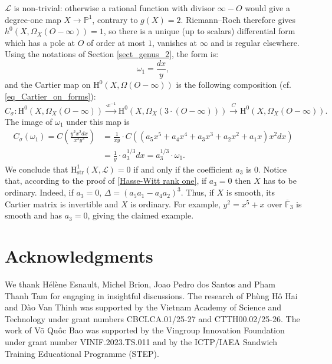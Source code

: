 \documentclass[12pt,a4]{amsart}
\theoremstyle{definition}
\begin{document}
\begin{appendix}
$\mathcal L$ is non-trivial: otherwise a rational function with divisor
$\infty-O$ would give a degree-one map $X\to\mathbb P^1$, contrary to $g(X)=2$.
Riemann--Roch therefore gives $h^0(X,\Omega_X(O-\infty))=1$, so there is a 
unique (up to scalars)  differential form which has a pole at $O$ of order at most
$1$, vanishes at $\infty$ and is regular elsewhere. 
Using the notations of Section \ref{sect_genus_2}, the form is:
\begin{equation*}
\omega_1 = \frac{dx}{y},
\end{equation*} 
and the Cartier map on $\mathrm{H}^0(X,\Omega(O - \infty))$ is the following composition
(cf. \eqref{eq_Cartier_on_forms}):
\begin{equation}
C_\sigma: \mathrm{H}^0(X,\Omega_X(O - \infty)) \xrightarrow{\cdot x^{-1}} 
\mathrm{H}^0(X,\Omega_X(3\cdot(O - \infty))) \xrightarrow{C} \mathrm{H}^0(X,\Omega_X(O - \infty)).
\end{equation}
The image of $\omega_1$ under this  map is 
\begin{align*}
C_\sigma(\omega_1) = C\left(\frac{y^2x^2dx}{x^3y^3}\right) & = \frac{1}{xy}
\cdot C((a_5x^5+a_4x^4+a_3x^3+a_2x^2+a_1x)x^2dx) \\
& = \frac{1}{y}\cdot a_3^{1/3}dx = a_3^{1/3}\cdot\omega_1.
\end{align*}
We conclude that $\mathrm H^1_\mathrm{str}(X,\mathcal L)=0$ if and only if the 
coefficient $a_3$ is 0. Notice that, according to the proof of \ref{Hasse-Witt rank one}, if
$a_3=0$ then $X$ has to be ordinary. Indeed, if $a_3=0$, 
$\Delta=(a_5a_1-a_4a_2)^3$. Thus, if $X$ is smooth, its Cartier matrix
is invertible and $X$ is ordinary. For example, $y^2=x^5+x$ over
$\overline{\mathbb F}_3$ is smooth and has $a_3=0$, giving the claimed example. 

\end{appendix} 

\section*{Acknowledgments}
We thank H\'el\`ene Esnault, Michel Brion, Joao Pedro dos Santos and Pham Thanh Tam for engaging in insightful discussions. 
The research of Ph\`ung H\^o Hai and D\`ao Van Thinh was supported by the Vietnam Academy of Science and Technology under grant numbers  CBCLCA.01/25-27 and CTTH00.02/25-26. The work of V\~o Qu\^oc Bao was supported  by the Vingroup Innovation Foundation under grant number VINIF.2023.TS.011 and by the ICTP/IAEA Sandwich Training Educational Programme (STEP).
\end{document}

